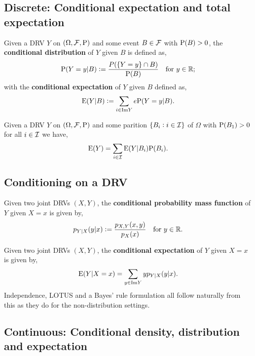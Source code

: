 \subsection{Discrete: Conditional expectation and total expectation}
\begin{definition}
    Given a DRV $Y$ on $(\Omega,\FFF,\P)$ and some event $B\in\FFF$ with $\P(B)>0$, the \textbf{conditional distribution} of $Y$ given $B$ is defined as, \[
        \P(Y=y|B):=\frac{P(\{Y=y\}\cap B)}{\P(B)} \quad
        \text{\textcolor{black}{ for }}y\in\RR\textcolor{black}{;}
    \]
    \begingroup\belowdisplayskip=-0pt
    with the \textbf{conditional expectation} of $Y$ given $B$ defined as, \[
    \E(Y|B) := \sum_{i\in\text{Im}Y}e\P(Y=y|B) \textcolor{black}{.}
    \]
    \endgroup
\end{definition}

\begingroup\belowdisplayskip=-10pt
\begin{theorem}
    Given a DRV $Y$ on $(\Omega,\FFF,\P)$ and some parition $\{B_i:i\in\III\}$ of $\Omega$ with $\P(B_1)>0$ for all $i\in\III$ we have, \[
    \E(Y)=\sum_{i\in\III}\E(Y|B_i)\P(B_i)\textcolor{black}{.}
    \]
\end{theorem}
\endgroup

\subsection{Conditioning on a DRV}

\begingroup\belowdisplayskip=-0pt
\begin{definition} 
    Given two joint DRVs $(X,Y)$, the \textbf{conditional probability mass function} of $Y$ given $X=x$ is given by, \[
        p_{Y|X}(y|x):=\frac{p_{X,Y}(x,y)}{p_X(x)} \quad
        \text{\textcolor{black}{ for }}y\in\RR\textcolor{black}{.}
    \]
\end{definition}
\endgroup

\begin{theorem}
    Given two joint DRVs $(X,Y)$, the \textbf{conditional expectation} of $Y$ given $X=x$ is given by, \[
        \E(Y|X=x)=\sum_{y\in\text{Im}Y}yp_{Y|X}(y|x)
        \textcolor{black}{.}
    \]
    Independence, LOTUS and a Bayes' rule formulation all follow naturally from this as they do for the non-distribution settings.
\end{theorem} 

\subsection{Continuous: Conditional density, distribution and expectation}

